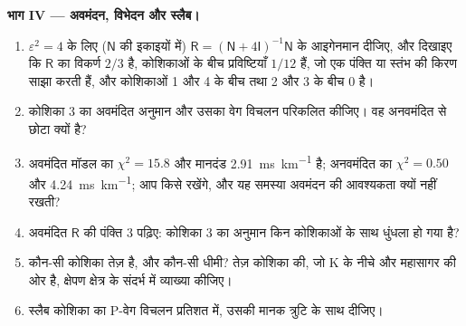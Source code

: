 \begin{problem}[{सप्ताहांत समस्या --- किरणें, लव तरंगें और लघु
टोमोग्राफ़ी, एक काल्पनिक स्टेशन के नीचे}]
\noindent\textbf{भाग IV --- अवमंदन, विभेदन और स्लैब।}
\begin{enumerate}[resume]
  \item $\varepsilon^2 = 4$ के लिए ($\mathsf N$ की इकाइयों में) $\mathsf R = (\mathsf N + 4\mathsf I)^{-1}\mathsf N$ के
        आइगेनमान दीजिए, और
        दिखाइए कि $\mathsf R$ का विकर्ण $2/3$ है, कोशिकाओं के बीच प्रविष्टियाँ $1/12$ हैं,
        जो एक पंक्ति या स्तंभ की किरण साझा करती हैं, और कोशिकाओं 1 और 4 के बीच
        तथा 2 और 3 के बीच $0$ है।
  \item कोशिका 3 का अवमंदित अनुमान और उसका वेग विचलन परिकलित कीजिए। वह
        अनवमंदित से छोटा क्यों है?
  \item अवमंदित मॉडल का $\chi^2 = 15.8$ और मानदंड \qty{2.91}{ms.km^{-1}} है;
        अनवमंदित का $\chi^2 = 0.50$ और \qty{4.24}{ms.km^{-1}}; आप किसे रखेंगे,
        और यह समस्या अवमंदन की आवश्यकता क्यों नहीं रखती?
  \item अवमंदित $\mathsf R$ की पंक्ति 3 पढ़िए: कोशिका 3 का अनुमान किन कोशिकाओं के
        साथ धुंधला हो गया है?
  \item कौन-सी कोशिका तेज़ है, और कौन-सी धीमी? तेज़ कोशिका की, जो K के नीचे और
        महासागर की ओर है, क्षेपण क्षेत्र के संदर्भ में व्याख्या कीजिए।
  \item स्लैब कोशिका का P-वेग विचलन प्रतिशत में, उसकी
        मानक त्रुटि के साथ दीजिए।
\end{enumerate}
\end{problem}

